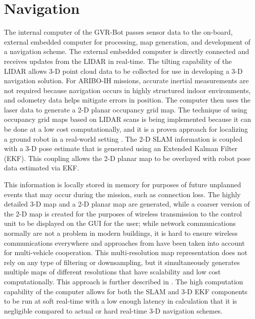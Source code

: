 \section{Navigation}\label{sec:navigation}

The internal computer of the GVR-Bot passes sensor data to the on-board, external embedded computer for processing, map generation, and development of a navigation scheme. The external embedded computer is directly connected and receives updates from the LIDAR in real-time. The tilting capability of the LIDAR allows 3-D point cloud data to be collected for use in developing a 3-D navigation solution. For ARIBO-IH missions, accurate inertial measurements are not required because navigation occurs in highly structured indoor environments, and odometry data helps mitigate errors in position. The computer then uses the laser data to generate a 2-D planar occupancy grid map. The technique of using occupancy grid maps based on LIDAR scans is being implemented because it can be done at a low cost computationally, and it is a proven approach for localizing a ground robot in a real-world setting \cite{thrun2005probabilistic,kohlbrecher2011flexible}. The 2-D SLAM information is coupled with a 3-D pose estimate that is generated using an Extended Kalman Filter (EKF). This coupling allows the 2-D planar map to be overlayed with robot pose data estimated via EKF. 

This information is locally stored in memory for purposes of future unplanned events that may occur during the mission, such as connection loss. The highly detailed 3-D map and a 2-D planar map are generated, while a coarser version of the 2-D map is created for the purposes of wireless transmission to the control unit to be displayed on the GUI for the user; while network communications normally are not a problem in modern buildings, it is hard to ensure wireless communications everywhere and approaches from \cite{ABK09} have been taken into account for multi-vehicle cooperation. This multi-resolution map representation does not rely on any type of filtering or downsampling, but it simultaneously generates multiple maps of different resolutions that have scalability and low cost computationally. This approach is further described in \cite{kohlbrecher2011flexible,habbecke2006iterative}. The high computation capability of the computer allows for both the SLAM and 3-D EKF components to be run at soft real-time with a low enough latency in calculation that it is negligible compared to actual or hard real-time 3-D navigation schemes.

